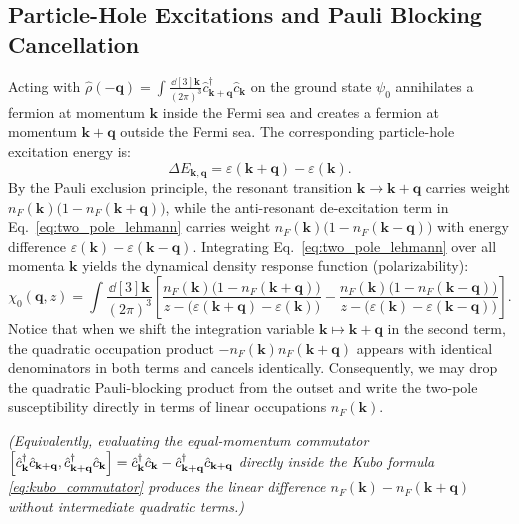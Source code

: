 \documentclass[11pt, a4paper]{article}
\numberwithin{equation}{section}
\begin{document}
\subsection{Particle-Hole Excitations and Pauli Blocking Cancellation}

Acting with $\hat{\rho}(-\mathbf{q}) = \int \frac{\dd[3]{\mathbf{k}}}{(2\pi)^3} \hat{c}^\dagger_{\mathbf{k}+\mathbf{q}} \hat{c}_{\mathbf{k}}$ on the ground state $\psi_0$ annihilates a fermion at momentum $\mathbf{k}$ inside the Fermi sea and creates a fermion at momentum $\mathbf{k} + \mathbf{q}$ outside the Fermi sea. The corresponding particle-hole excitation energy is:
\begin{equation}
  \Delta E_{\mathbf{k}, \mathbf{q}} = \varepsilon(\mathbf{k} + \mathbf{q}) - \varepsilon(\mathbf{k}).
\end{equation}
By the Pauli exclusion principle, the resonant transition $\mathbf{k} \to \mathbf{k} + \mathbf{q}$ carries weight $n_F(\mathbf{k})\big(1 - n_F(\mathbf{k}+\mathbf{q})\big)$, while the anti-resonant de-excitation term in Eq.~\eqref{eq:two_pole_lehmann} carries weight $n_F(\mathbf{k})\big(1 - n_F(\mathbf{k}-\mathbf{q})\big)$ with energy difference $\varepsilon(\mathbf{k}) - \varepsilon(\mathbf{k}-\mathbf{q})$. Integrating Eq.~\eqref{eq:two_pole_lehmann} over all momenta $\mathbf{k}$ yields the dynamical density response function (polarizability):
\begin{equation}\label{eq:pauli_two_pole}
  \chi_0(\mathbf{q}, z)
  = \int \frac{\dd[3]{\mathbf{k}}}{(2\pi)^3} \left[
    \frac{n_F(\mathbf{k})\big(1 - n_F(\mathbf{k}+\mathbf{q})\big)}{z - \big(\varepsilon(\mathbf{k}+\mathbf{q}) - \varepsilon(\mathbf{k})\big)}
    - \frac{n_F(\mathbf{k})\big(1 - n_F(\mathbf{k}-\mathbf{q})\big)}{z - \big(\varepsilon(\mathbf{k}) - \varepsilon(\mathbf{k}-\mathbf{q})\big)}
  \right].
\end{equation}
Notice that when we shift the integration variable $\mathbf{k} \mapsto \mathbf{k} + \mathbf{q}$ in the second term, the quadratic occupation product $-n_F(\mathbf{k}) n_F(\mathbf{k}+\mathbf{q})$ appears with identical denominators in both terms and cancels identically. Consequently, we may drop the quadratic Pauli-blocking product from the outset and write the two-pole susceptibility directly in terms of linear occupations $n_F(\mathbf{k})$.

\emph{(Equivalently, evaluating the equal-momentum commutator $\comm{\hat{c}^\dagger_{\mathbf{k}}\hat{c}_{\mathbf{k}+\mathbf{q}}}{\hat{c}^\dagger_{\mathbf{k}+\mathbf{q}}\hat{c}_{\mathbf{k}}} = \hat{c}^\dagger_{\mathbf{k}}\hat{c}_{\mathbf{k}} - \hat{c}^\dagger_{\mathbf{k}+\mathbf{q}}\hat{c}_{\mathbf{k}+\mathbf{q}}$ directly inside the Kubo formula \eqref{eq:kubo_commutator} produces the linear difference $n_F(\mathbf{k}) - n_F(\mathbf{k}+\mathbf{q})$ without intermediate quadratic terms.)}
\end{document}
